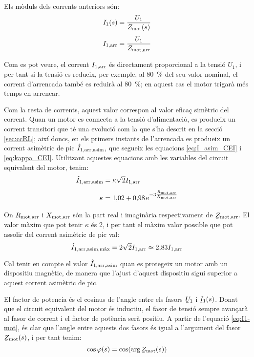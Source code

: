 Els mòduls dels corrents anteriors són:
\begin{subequations}
\begin{align}
    I_1(s) &= \frac{U_1}{Z_\mathrm{mot}(s)} \label{eq:mot-I1}\\[1ex]
    I_\mathrm{1,arr} &= \frac{U_1}{Z_\mathrm{mot,arr}}\label{eq:mot-Iarr}
\end{align}
\end{subequations}

Com es pot veure, el corrent $I_\mathrm{1,arr}$ és directament proporcional a la tensió $U_1$, i per tant si la tensió es redueix, per exemple, al \SI{80}{\%} del seu valor nominal, el corrent d'arrencada també es reduirà al \SI{80}{\%}; en aquest cas el motor trigarà més temps en arrencar.

Com la resta de corrents, aquest valor correspon al valor eficaç simètric del corrent. Quan un motor es connecta a la tensió d'alimentació, es produeix un corrent transitori que té una evolució com la que s'ha descrit en la secció \vref{sec:ccRL}; així doncs, en els primers instants de l'arrencada es produeix un corrent asimètric de pic $\hat{I}_\mathrm{1,arr,asim}$, que segueix les equacions \eqref{eq:I_asim_CEI} i \eqref{eq:kappa_CEI}. Utilitzant aquestes equacions amb les variables del circuit equivalent del motor, tenim:
\begin{subequations}
\begin{align}
    \hat{I}_\mathrm{1,arr,asim} &= \kappa \sqrt{2} I_\mathrm{1,arr}  \\[1ex]
    \kappa &= 1{,}02 + 0{,}98 \,\mathrm{e}^{-3\frac{R_\mathrm{mot,arr}}{X_\mathrm{mot,arr}}}
\end{align}
\end{subequations}

On $R_\mathrm{mot,arr}$ i $X_\mathrm{mot,arr}$ són la part real i imaginària respectivament de $\cmplx{Z}\ped{mot,arr}$. El valor màxim que pot tenir  $\kappa$ és 2, i per tant el màxim valor possible que pot assolir del corrent asimètric de pic val:
\begin{equation}
	\hat{I}_\mathrm{1,arr,asim,\text{màx}} =  2\sqrt{2} I_\mathrm{1,arr} \approx 2{,}83 I_\mathrm{1,arr} 
\end{equation}

Cal tenir en compte el valor $\hat{I}_\mathrm{1,arr,asim}$ quan es protegeix un motor amb un dispositiu magnètic, de manera que l'ajust d'aquest dispositiu sigui superior a aquest corrent asimètric de  pic.

El factor de potencia és el cosinus de l'angle entre els fasors $\cmplx{U}_1$ i $\cmplx{I}_1(s)$. Donat que el circuit equivalent del motor és inductiu, el fasor de tensió sempre avançarà al fasor de corrent i el factor de potència serà positiu. A partir de l'equació \eqref{eq:I1-mot}, és clar que l'angle entre aquests dos fasors és igual a l'argument del fasor $\cmplx{Z}\ped{mot}(s)$, i per tant tenim:
\begin{equation}\index{motors d'inducció!factor de potència}
	\cos\varphi(s) = \cos(\arg\cmplx{Z}\ped{mot}(s))\label{eq:cos-fi-mot}
\end{equation}

